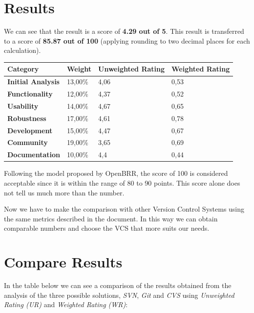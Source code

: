 \documentclass[11pt]{scrartcl}
\begin{document}
\section{Results}

We can see that the result is a score of \textbf{4.29 out of 5}. This result is transferred to a score of \textbf{85.87 out of 100} (applying rounding to two decimal places for each calculation).

\begin{tabular}{|l|l|l|l|}
    \hline {\bf Category} & {\bf Weight} & {\bf Unweighted Rating} & {\bf Weighted Rating}\\
    \hline {\bf Initial Analysis}	 & 13,00\% & 4,06 & 0,53 \\
    \hline {\bf Functionality} & 12,00\% & 4,37 & 0,52\\
    \hline {\bf Usability} & 14,00\% & 4,67 & 0,65\\
    \hline {\bf Robustness} & 17,00\% & 4,61 & 0,78\\
    \hline {\bf Development} & 15,00\% & 4,47 & 0,67\\
    \hline {\bf Community} & 19,00\% & 3,65 & 0,69\\
    \hline {\bf Documentation} & 10,00\% & 4,4 & 0,44\\
    \hline
\end{tabular}

\par Following the model proposed by OpenBRR, the score of 100 is considered acceptable since it is within the range of 80 to 90 points. This score alone does not tell us much more than the number.

\par Now we have to make the comparison with other Version Control Systems using the same metrics described in the document. In this way we can obtain comparable numbers and choose the VCS that more suits our needs.

\section{Compare Results}

In the table below we can see a comparison of the results obtained from the analysis of the three possible solutions, \emph{SVN}, \emph{Git} and \emph{CVS} using \emph{Unweighted Rating (UR)} and \emph{Weighted Rating (WR)}:
\end{document}
